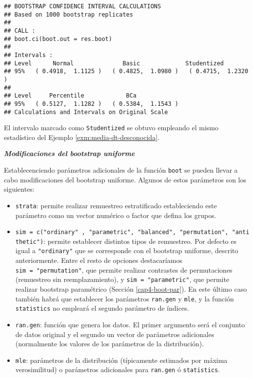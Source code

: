 \documentclass[
]{book}
\theoremstyle{definition}
\theoremstyle{definition}
\theoremstyle{definition}
\theoremstyle{remark}
\begin{document}
\begin{verbatim}
## BOOTSTRAP CONFIDENCE INTERVAL CALCULATIONS
## Based on 1000 bootstrap replicates
## 
## CALL : 
## boot.ci(boot.out = res.boot)
## 
## Intervals : 
## Level      Normal              Basic             Studentized     
## 95%   ( 0.4918,  1.1125 )   ( 0.4825,  1.0980 )   ( 0.4715,  1.2320 )  
## 
## Level     Percentile            BCa          
## 95%   ( 0.5127,  1.1282 )   ( 0.5384,  1.1543 )  
## Calculations and Intervals on Original Scale
\end{verbatim}

El intervalo marcado como \texttt{Studentized} se obtuvo empleando el mismo estadístico
del Ejemplo \ref{exm:media-dt-desconocida}.

\textbf{\emph{Modificaciones del bootstrap uniforme}}

Establecenciendo parámetros adicionales de la función \texttt{boot} se pueden llevar
a cabo modificaciones del bootstrap uniforme.
Algunos de estos parámetros son los siguientes:

\begin{itemize}
\item
  \texttt{strata}: permite realizar remuestreo estratificado estableciendo este parámetro
  como un vector numérico o factor que defina los grupos.
\item
  \texttt{sim\ =\ c("ordinary"\ ,\ "parametric",\ "balanced",\ "permutation",\ "antithetic")}:
  permite establecer distintos tipos de remuestreo.
  Por defecto es igual a \texttt{"ordinary"} que se corresponde con el bootstrap uniforme,
  descrito anteriormente. Entre el resto de opciones destacaríamos
  \texttt{sim\ =\ "permutation"}, que permite realizar contrastes de
  permutaciones (remuestreo sin reemplazamiento), y \texttt{sim\ =\ "parametric"},
  que permite realizar bootstrap paramétrico (Sección \ref{cap4-boot-par}).
  En este último caso también habrá que establecer los parámetros \texttt{ran.gen} y
  \texttt{mle}, y la función \texttt{statistics} no empleará el segundo parámetro de índices.
\item
  \texttt{ran.gen}: función que genera los datos. El primer argumento será el conjunto de datos
  original y el segundo un vector de parámetros adicionales
  (normalmente los valores de los parámetros de la distribución).
\item
  \texttt{mle}: parámetros de la distribución (típicamente estimados por máxima verosimilitud)
  o parámetros adicionales para \texttt{ran.gen} ó \texttt{statistics}.
\end{itemize}
\end{document}
